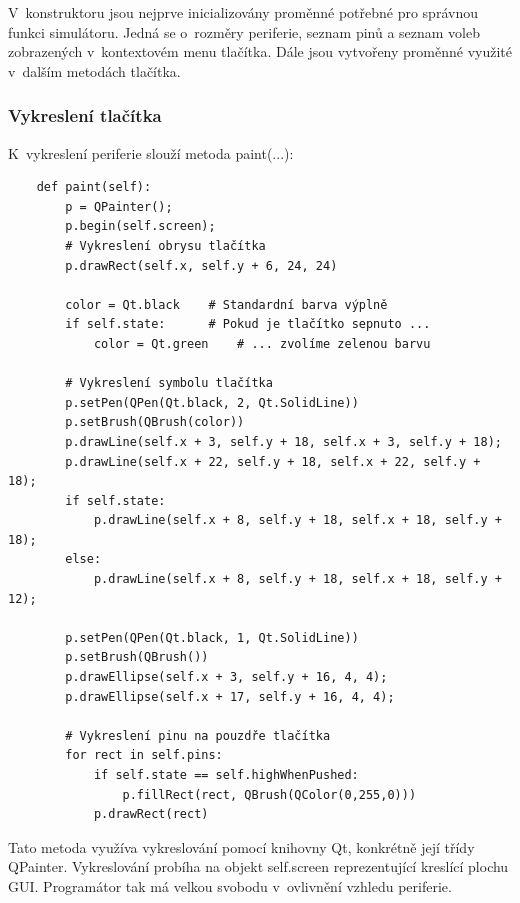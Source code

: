 V~konstruktoru jsou nejprve inicializovány proměnné potřebné pro správnou funkci simulátoru. Jedná se o~rozměry periferie, seznam pinů a seznam voleb zobrazených v~kontextovém menu tlačítka. Dále jsou vytvořeny proměnné využité v~dalším metodách tlačítka.

\subsubsection{Vykreslení tlačítka}

K~vykreslení periferie slouží metoda paint(...):

\begin{lstlisting}
	def paint(self):
		p = QPainter();
		p.begin(self.screen);
		# Vykreslení obrysu tlačítka
		p.drawRect(self.x, self.y + 6, 24, 24)

		color = Qt.black	# Standardní barva výplně
		if self.state:		# Pokud je tlačítko sepnuto ...
			color = Qt.green	# ... zvolíme zelenou barvu

		# Vykreslení symbolu tlačítka
		p.setPen(QPen(Qt.black, 2, Qt.SolidLine))
		p.setBrush(QBrush(color))
		p.drawLine(self.x + 3, self.y + 18, self.x + 3, self.y + 18);
		p.drawLine(self.x + 22, self.y + 18, self.x + 22, self.y + 18);
		if self.state:
			p.drawLine(self.x + 8, self.y + 18, self.x + 18, self.y + 18);
		else:
			p.drawLine(self.x + 8, self.y + 18, self.x + 18, self.y + 12);

		p.setPen(QPen(Qt.black, 1, Qt.SolidLine))
		p.setBrush(QBrush())
		p.drawEllipse(self.x + 3, self.y + 16, 4, 4);
		p.drawEllipse(self.x + 17, self.y + 16, 4, 4);

		# Vykreslení pinu na pouzdře tlačítka
		for rect in self.pins:
			if self.state == self.highWhenPushed:
				p.fillRect(rect, QBrush(QColor(0,255,0)))
			p.drawRect(rect)
\end{lstlisting}

Tato metoda využíva vykreslování pomocí knihovny Qt, konkrétně její třídy QPainter. Vykreslování probíha na objekt self.screen reprezentující kreslící plochu GUI. Programátor tak má velkou svobodu v~ovlivnění vzhledu periferie.

